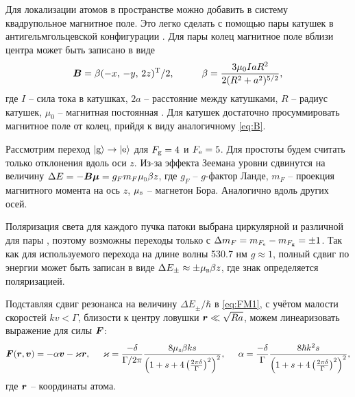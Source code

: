 Для локализации атомов в пространстве можно добавить в систему квадрупольное магнитное поле. Это легко сделать с помощью пары катушек в антигельмгольцевской конфигурации \cite{PhysRevA83}. Для пары колец магнитное поле вблизи центра может быть записано в виде
\begin{equation}
	\vc{B} = \beta (-x,\,  -y,\, 2z)\T/2,
	\hspace{10 mm} 
	\beta = \frac{3 \mu_0 I a R^2}{2(R^2+a^2)^{5/2}},
	\label{eq:B}
\end{equation}
где $I$ -- сила тока в катушках, $2a$ -- расстояние между катушками, $R$ -- радиус катушек, $\mu_0$ -- магнитная постоянная \cite{PhysRevA83}. Для катушек достаточно просуммировать магнитное поле от колец, прийдя к виду аналогичному \eqref{eq:B}. 

Рассмотрим переход $\left| \text{g} \right\rangle \to \left| \text{e} \right\rangle$ для $F_{\textnormal{g}} = 4$ и $F_{\textnormal{e}} = 5$. Для простоты будем считать только отклонения вдоль оси $z$. Из-за эффекта Зеемана уровни сдвинутся на величину $\Delta E = - \vc{B} \vc{\mu} = g_F m_F \subt{\mu}{B} \beta z$, где $g_F$ -- $g$-фактор Ланде, $m_F$ -- проекция магнитного момента на ось $z$, $\subt{\mu}{B}$ -- магнетон Бора. Аналогично вдоль других осей.

Поляризация света для каждого пучка патоки выбрана циркулярной и различной для пары \cite{vlad}, поэтому возможны переходы только с  $\Delta m_F = m_{F_{\textnormal{e}}}-m_{F_{\textnormal{g}}}= \pm 1$. Так как для используемого перехода на длине волны 530.7 нм $g \approx 1$, полный сдвиг по энергии может быть записан в виде $\Delta E_{\pm} \approx \pm \subt{\mu}{B} \beta z$, где знак определяется поляризацией. 

Подставляя сдвиг резонанса на величину $\Delta E_{\pm} / \hbar$ в \eqref{eq:FM1}, с учётом малости скоростей $k v < \Gamma$, близости к центру ловушки $\boldsymbol{r} \ll \sqrt{R a}$, можем линеаризовать выражение для силы $\boldsymbol{F}$:
\begin{equation}
	\vc{F}(\vc{r}, \vc{v}) = -\alpha \vc{v} - \varkappa \vc{r},
	\hspace{5 mm} 
	\varkappa = \frac{-\delta}{\Gamma/2\pi}\frac{8 \subt{\mu}{B} \beta k s}{\left(1+s+4\left(\frac{2\pi \delta}{\Gamma}\right)^2\right)^2},
	\hspace{5 mm} 
	\alpha = \frac{-\delta}{\Gamma} \frac{8 \hbar k^2 s}{\left(1+s+4\left(\frac{2\pi \delta}{\Gamma}\right)^2\right)^2},
\end{equation}
где $\boldsymbol{r}$  -- координаты атома.











